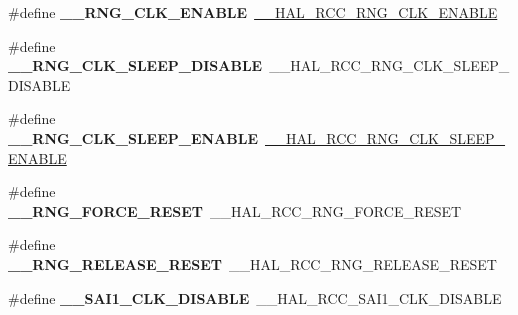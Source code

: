 \begin{DoxyCompactItemize}
\item 
\mbox{\label{group___h_a_l___r_c_c___aliased_ga766db26e2cb32163c41af63ea098d17b}} 
\#define {\bfseries \+\_\+\+\_\+\+R\+N\+G\+\_\+\+C\+L\+K\+\_\+\+E\+N\+A\+B\+LE}~\mbox{\hyperlink{group___r_c_c_ex___peripheral___clock___enable___disable_ga01b37cc75f9a14a55b9e89e8ccfac8af}{\+\_\+\+\_\+\+H\+A\+L\+\_\+\+R\+C\+C\+\_\+\+R\+N\+G\+\_\+\+C\+L\+K\+\_\+\+E\+N\+A\+B\+LE}}
\item 
\mbox{\label{group___h_a_l___r_c_c___aliased_gacb8c82d2f6524d61f53f4d744b1ea469}} 
\#define {\bfseries \+\_\+\+\_\+\+R\+N\+G\+\_\+\+C\+L\+K\+\_\+\+S\+L\+E\+E\+P\+\_\+\+D\+I\+S\+A\+B\+LE}~\+\_\+\+\_\+\+H\+A\+L\+\_\+\+R\+C\+C\+\_\+\+R\+N\+G\+\_\+\+C\+L\+K\+\_\+\+S\+L\+E\+E\+P\+\_\+\+D\+I\+S\+A\+B\+LE
\item 
\mbox{\label{group___h_a_l___r_c_c___aliased_ga986bcd5b8c1fcb8798117ab1fa762e28}} 
\#define {\bfseries \+\_\+\+\_\+\+R\+N\+G\+\_\+\+C\+L\+K\+\_\+\+S\+L\+E\+E\+P\+\_\+\+E\+N\+A\+B\+LE}~\mbox{\hyperlink{group___r_c_c_ex___peripheral___clock___sleep___enable___disable_ga03ec704e7309312630b3a572fb6f8856}{\+\_\+\+\_\+\+H\+A\+L\+\_\+\+R\+C\+C\+\_\+\+R\+N\+G\+\_\+\+C\+L\+K\+\_\+\+S\+L\+E\+E\+P\+\_\+\+E\+N\+A\+B\+LE}}
\item 
\mbox{\label{group___h_a_l___r_c_c___aliased_gae619bcc84a660ded8baf711bfaca4069}} 
\#define {\bfseries \+\_\+\+\_\+\+R\+N\+G\+\_\+\+F\+O\+R\+C\+E\+\_\+\+R\+E\+S\+ET}~\+\_\+\+\_\+\+H\+A\+L\+\_\+\+R\+C\+C\+\_\+\+R\+N\+G\+\_\+\+F\+O\+R\+C\+E\+\_\+\+R\+E\+S\+ET
\item 
\mbox{\label{group___h_a_l___r_c_c___aliased_ga24e421e3737cdb35e854520e14f29266}} 
\#define {\bfseries \+\_\+\+\_\+\+R\+N\+G\+\_\+\+R\+E\+L\+E\+A\+S\+E\+\_\+\+R\+E\+S\+ET}~\+\_\+\+\_\+\+H\+A\+L\+\_\+\+R\+C\+C\+\_\+\+R\+N\+G\+\_\+\+R\+E\+L\+E\+A\+S\+E\+\_\+\+R\+E\+S\+ET
\item 
\mbox{\label{group___h_a_l___r_c_c___aliased_ga037179746d806a9eb830087a3d11a184}} 
\#define {\bfseries \+\_\+\+\_\+\+S\+A\+I1\+\_\+\+C\+L\+K\+\_\+\+D\+I\+S\+A\+B\+LE}~\+\_\+\+\_\+\+H\+A\+L\+\_\+\+R\+C\+C\+\_\+\+S\+A\+I1\+\_\+\+C\+L\+K\+\_\+\+D\+I\+S\+A\+B\+LE

\end{DoxyCompactItemize}
